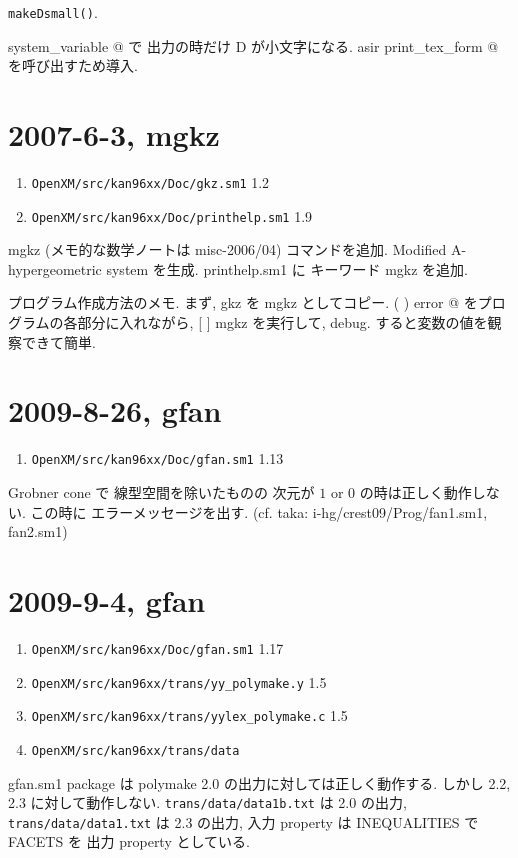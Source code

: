 \documentclass{jarticle}
\begin{document}
{\tt makeDsmall()}.

\verb@ [(UseDsmall) 1] system_variable @ で
出力の時だけ D が小文字になる.
asir \verb@ print_tex_form @ を呼び出すため導入.

\section{2007-6-3,  mgkz}
\begin{enumerate}
\item {\tt OpenXM/src/kan96xx/Doc/gkz.sm1} 1.2 
\item {\tt OpenXM/src/kan96xx/Doc/printhelp.sm1} 1.9
\end{enumerate}
	
mgkz (メモ的な数学ノートは misc-2006/04) コマンドを追加.
Modified A-hypergeometric system を生成.
printhelp.sm1 に キーワード mgkz を追加.

プログラム作成方法のメモ.
まず, gkz を mgkz としてコピー.
\verb@ (  ) error @ をプログラムの各部分に入れながら,
[ ] mgkz を実行して, debug.
すると変数の値を観察できて簡単.

\section{2009-8-26,  gfan}
\begin{enumerate}
\item {\tt OpenXM/src/kan96xx/Doc/gfan.sm1} 1.13 
\end{enumerate}

Grobner cone で 線型空間を除いたものの
次元が $1$ or $0$ の時は正しく動作しない.
この時に エラーメッセージを出す.
(cf. taka: i-hg/crest09/Prog/fan1.sm1, fan2.sm1)

\section{2009-9-4,  gfan}
\begin{enumerate}
\item {\tt OpenXM/src/kan96xx/Doc/gfan.sm1} 1.17
\item {\tt OpenXM/src/kan96xx/trans/yy\_polymake.y} 1.5
\item {\tt OpenXM/src/kan96xx/trans/yylex\_polymake.c} 1.5
\item {\tt OpenXM/src/kan96xx/trans/data} 
\end{enumerate}

gfan.sm1 package は polymake 2.0 の出力に対しては正しく動作する.
しかし 2.2, 2.3 に対して動作しない.
{\tt trans/data/data1b.txt} は 2.0 の出力,
{\tt trans/data/data1.txt} は 2.3 の出力,
入力 property は INEQUALITIES で FACETS を 出力 property としている.
\end{document}
